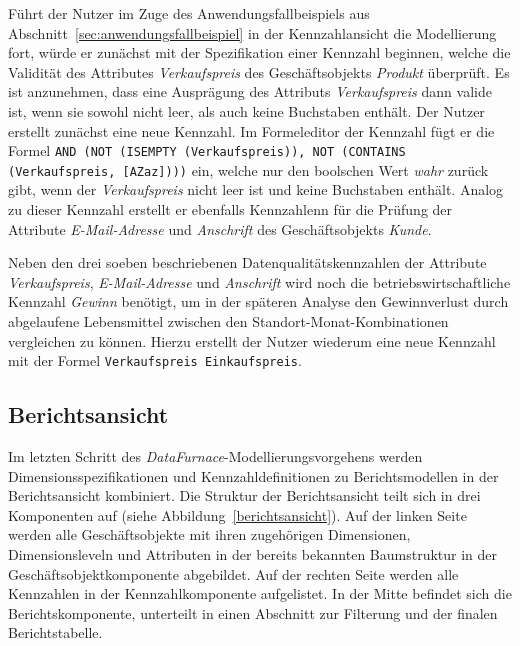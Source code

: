 \documentclass[
  language=german, %
  type=bachelor,%
  ngerman
]{isthesis}
\begin{document}
\begin{content}
  Führt der Nutzer im Zuge des Anwendungsfallbeispiels aus
  Abschnitt~\ref{sec:anwendungsfallbeispiel} in der Kennzahlansicht die
  Modellierung fort, würde er zunächst mit der Spezifikation einer Kennzahl
  beginnen, welche die Validität des Attributes \textit{Verkaufspreis} des
  Geschäftsobjekts \textit{Produkt} überprüft. Es ist anzunehmen, dass eine
  Ausprägung des Attributs \textit{Verkaufspreis} dann valide ist, wenn sie
  sowohl nicht leer, als auch keine Buchstaben enthält. Der Nutzer erstellt
  zunächst eine neue Kennzahl. Im Formeleditor der Kennzahl fügt er die Formel
  \texttt{AND (NOT (ISEMPTY (Verkaufspreis)), NOT (CONTAINS (Verkaufspreis,
  [A\textminus{}Za\textminus{}z])))} ein, welche nur den boolschen Wert
  \textit{wahr} zurück gibt, wenn der \textit{Verkaufspreis} nicht leer ist und
  keine Buchstaben enthält. Analog zu dieser Kennzahl erstellt er ebenfalls
  Kennzahlenn für die Prüfung der Attribute \textit{E-Mail-Adresse} und
  \textit{Anschrift} des Geschäftsobjekts \textit{Kunde}.

  Neben den drei soeben beschriebenen Datenqualitätskennzahlen der Attribute
  \textit{Verkaufspreis}, \textit{E-Mail-Adresse} und \textit{Anschrift} wird
  noch die betriebswirtschaftliche Kennzahl \textit{Gewinn} benötigt, um in der
  späteren Analyse den Gewinnverlust durch abgelaufene Lebensmittel zwischen
  den Standort-Monat-Kombinationen vergleichen zu können. Hierzu erstellt der
  Nutzer wiederum eine neue Kennzahl mit der Formel \texttt{Verkaufspreis \textminus{}
  Einkaufspreis}.


  \subsection{Berichtsansicht}\label{subsec:berichtsansicht}

  Im letzten Schritt des \textit{DataFurnace}-Modellierungsvorgehens werden
  Dimensionsspezifikationen und Kennzahldefinitionen zu Berichtsmodellen in der
  Berichtsansicht kombiniert. Die Struktur der Berichtsansicht teilt sich in
  drei Komponenten auf (siehe Abbildung~\ref{berichtsansicht}). Auf der linken
  Seite werden alle Geschäftsobjekte mit ihren zugehörigen Dimensionen,
  Dimensionsleveln und Attributen in der bereits bekannten Baumstruktur in der
  Geschäftsobjektkomponente abgebildet.  Auf der rechten Seite werden alle
  Kennzahlen in der Kennzahlkomponente aufgelistet. In der Mitte befindet sich
  die Berichtskomponente, unterteilt in einen Abschnitt zur Filterung und der
  finalen Berichtstabelle.


\end{content}
\end{document}
